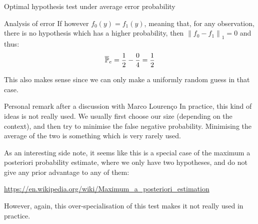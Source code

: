 \documentclass[a4paper]{article}
\begin{document}
\begin{parag}{Optimal hypothesis test under average error probability}
\begin{subparag}{Analysis of error}
        If however $f_0\left(y\right) = f_1\left(y\right)$, meaning that, for any observation, there is no hypothesis which has a higher probability, then $\left\|f_0 - f_1\right\|_1 = 0$ and thus: 
        \[\overline{\mathbb{P}}_e = \frac{1}{2} - \frac{0}{4} = \frac{1}{2}\]
        
        This also makes sense since we can only make a uniformly random guess in that case.
    \end{subparag}

    \begin{subparag}{Personal remark after a discussion with Marco Lourenço}
        In practice, this kind of ideas is not really used. We usually first choose our size (depending on the context), and then try to minimise the false negative probability. Minimising the average of the two is something which is very rarely used.

        As an interesting side note, it seems like this is a special case of the maximum a posteriori probability estimate, where we only have two hypotheses, and do not give any prior advantage to any of them:
        \begin{center}
            \url{https://en.wikipedia.org/wiki/Maximum_a_posteriori_estimation}
        \end{center}

        However, again, this over-specialisation of this test makes it not really used in practice.
    \end{subparag}
\end{parag}
\end{document}
